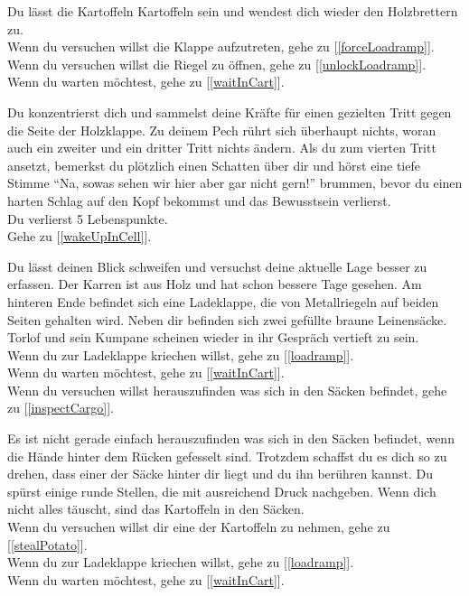 
Du lässt die Kartoffeln Kartoffeln sein und wendest dich wieder den Holzbrettern zu.
\\Wenn du versuchen willst die Klappe aufzutreten, gehe zu [\ref{forceLoadramp}].
\\Wenn du versuchen willst die Riegel zu öffnen, gehe zu [\ref{unlockLoadramp}].
\\Wenn du warten möchtest, gehe zu [\ref{waitInCart}].


Du konzentrierst dich und sammelst deine Kräfte für einen gezielten Tritt gegen die Seite der Holzklappe. Zu deinem Pech rührt sich überhaupt nichts, woran auch ein zweiter und ein dritter Tritt nichts ändern. Als du zum vierten Tritt ansetzt, bemerkst du plötzlich einen Schatten über dir und hörst eine tiefe Stimme ``Na, sowas sehen wir hier aber gar nicht gern!'' brummen, bevor du einen harten Schlag auf den Kopf bekommst und das Bewusstsein verlierst.\\
Du verlierst 5 Lebenspunkte.
\\Gehe zu [\ref{wakeUpInCell}].

Du lässt deinen Blick schweifen und versuchst deine aktuelle Lage besser zu erfassen. Der Karren ist aus Holz und hat schon bessere Tage gesehen. Am hinteren Ende befindet sich eine Ladeklappe, die von Metallriegeln auf beiden Seiten gehalten wird. Neben dir befinden sich zwei gefüllte braune Leinensäcke. Torlof und sein Kumpane scheinen wieder in ihr Gespräch vertieft zu sein.
\\Wenn du zur Ladeklappe kriechen willst, gehe zu [\ref{loadramp}].
\\Wenn du warten möchtest, gehe zu [\ref{waitInCart}].
\\Wenn du versuchen willst herauszufinden was sich in den Säcken befindet, gehe zu [\ref{inspectCargo}].


Es ist nicht gerade einfach herauszufinden was sich in den Säcken befindet, wenn die Hände hinter dem Rücken gefesselt sind. Trotzdem schaffst du es dich so zu drehen, dass einer der Säcke hinter dir liegt und du ihn berühren kannst. Du spürst einige runde Stellen, die mit ausreichend Druck nachgeben. Wenn dich nicht alles täuscht, sind das Kartoffeln in den Säcken.
\\Wenn du versuchen willst dir eine der Kartoffeln zu nehmen, gehe zu [\ref{stealPotato}].
\\Wenn du zur Ladeklappe kriechen willst, gehe zu [\ref{loadramp}].
\\Wenn du warten möchtest, gehe zu [\ref{waitInCart}].

